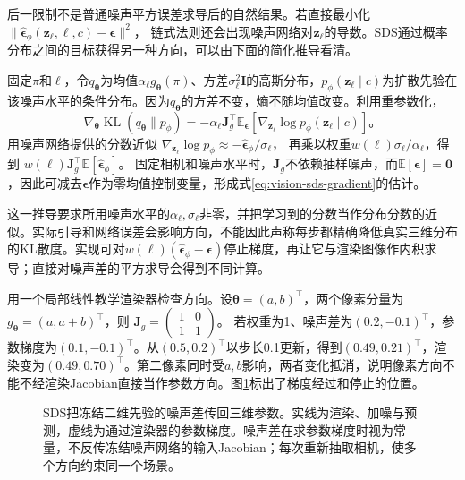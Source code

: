 后一限制不是普通噪声平方误差求导后的自然结果。若直接最小化
$\|\widehat{\bm\epsilon}_\phi(\bm z_\ell,\ell,c)-\bm\epsilon\|^2$，
链式法则还会出现噪声网络对$\bm z_\ell$的导数。SDS通过概率分布之间的目标获得另一种方向，可以由下面的简化推导看清。

固定$\pi$和$\ell$，令$q_{\bm\theta}$为均值$\alpha_\ell g_{\bm\theta}(\pi)$、方差$\sigma_\ell^2\bm I$的高斯分布，$p_\phi(\bm z_\ell\mid c)$为扩散先验在该噪声水平的条件分布。因为$q_{\bm\theta}$的方差不变，熵不随均值改变。利用重参数化，
\[
 \nabla_{\bm\theta}\operatorname{KL}(q_{\bm\theta}\|p_\phi)
 =-\alpha_\ell\bm J_g^\top
     \mathbb E_{\bm\epsilon}
       [\nabla_{\bm z_\ell}\log p_\phi(\bm z_\ell\mid c)]\text{。}
\]
用噪声网络提供的分数近似
$\nabla_{\bm z_\ell}\log p_\phi\approx
-\widehat{\bm\epsilon}_\phi/\sigma_\ell$，
再乘以权重$w(\ell)\sigma_\ell/\alpha_\ell$，得到
$w(\ell)\bm J_g^\top\mathbb E[\widehat{\bm\epsilon}_\phi]$。
固定相机和噪声水平时，$\bm J_g$不依赖抽样噪声，而$\mathbb E[\bm\epsilon]=\bm0$，因此可减去$\bm\epsilon$作为零均值控制变量，形成式\eqref{eq:vision-sds-gradient}的估计。

这一推导要求所用噪声水平的$\alpha_\ell,\sigma_\ell$非零，并把学习到的分数当作分布分数的近似。实际引导和网络误差会影响方向，不能因此声称每步都精确降低真实三维分布的KL散度。实现可对$w(\ell)(\widehat{\bm\epsilon}_\phi-\bm\epsilon)$停止梯度，再让它与渲染图像作内积求导；直接对噪声差的平方求导会得到不同计算。

用一个局部线性教学渲染器检查方向。设$\bm\theta=(a,b)^\top$，两个像素分量为$g_{\bm\theta}=(a,a+b)^\top$，则
$\bm J_g=\left(\begin{smallmatrix}1&0\\1&1\end{smallmatrix}\right)$。
若权重为1、噪声差为$(0.2,-0.1)^\top$，参数梯度为$(0.1,-0.1)^\top$。从$(0.5,0.2)^\top$以步长0.1更新，得到$(0.49,0.21)^\top$，渲染变为$(0.49,0.70)^\top$。第二像素同时受$a,b$影响，两者变化抵消，说明像素方向不能不经渲染Jacobian直接当作参数方向。图\ref{fig:vision-sds-path}标出了梯度经过和停止的位置。

\begin{figure}[htbp]
  \centering
  
  \caption{SDS把冻结二维先验的噪声差传回三维参数。实线为渲染、加噪与预测，虚线为通过渲染器的参数梯度。噪声差在求参数梯度时视为常量，不反传冻结噪声网络的输入Jacobian；每次重新抽取相机，使多个方向约束同一个场景。}
  \label{fig:vision-sds-path}
\end{figure}
\FloatBarrier

